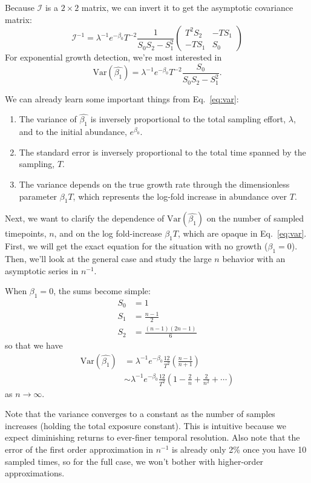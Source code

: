 \documentclass[12pt, letterpaper]{article}
\begin{document}
Because $\mathcal{I}$ is a $2 \times 2$ matrix, we can invert it to get the asymptotic covariance matrix:
\begin{equation}
    {\mathcal{I}}^{-1} = \lambda^{-1} e^{-\beta_0} T^{-2} \frac{1}{S_0 S_2 - S_1^2}
    \begin{pmatrix}
        T^2 S_2 & -T S_1 \\
        -T S_1 & S_0
    \end{pmatrix}
\end{equation}
For exponential growth detection, we're most interested in
\begin{equation}
    \textrm{Var}(\hat{\beta_1}) = \lambda^{-1} e^{-\beta_0} T^{-2} \frac{S_0}{S_0 S_2 - S_1^2}.
    \label{eq:var}
\end{equation}

We can already learn some important things from Eq.~\ref{eq:var}:
\begin{enumerate}
    \item The variance of $\hat{\beta_1}$ is inversely proportional to the total sampling effort, $\lambda$, and to the initial abundance, $e^{\beta_0}$.
    \item The standard error is inversely proportional to the total time spanned by the sampling, $T$.
    \item The variance depends on the true growth rate through the dimensionless parameter $\beta_1 T$, which represents the log-fold increase in abundance over $T$.
\end{enumerate}

Next, we want to clarify the dependence of $\textrm{Var}(\hat{\beta_1})$ on the number of sampled timepoints, $n$, and on the log fold-increase $\beta_1 T$, which are opaque in Eq.~\ref{eq:var}.
First, we will get the exact equation for the situation with no growth ($\beta_1 = 0$).
Then, we'll look at the general case and study the large $n$ behavior with an asymptotic series in $n^{-1}$.

When $\beta_1 = 0$, the sums become simple:
\begin{align}
    S_0 &= 1 \\
    S_1 &= \frac{n-1}{2} \\
    S_2 &= \frac{(n-1)(2n-1)}{6}
\end{align}
so that we have
\begin{align}
    \textrm{Var}(\hat{\beta_1}) &= \lambda^{-1} e^{-\beta_0} \frac{12}{T^2} \left(\frac{n-1}{n+1}\right) \\
                                &\sim \lambda^{-1} e^{-\beta_0} \frac{12}{T^2} \left(1 - \frac{2}{n} + \frac{2}{n^2} + \cdots\right)
\end{align}
as $n \to \infty$.

Note that the variance converges to a constant as the number of samples increases (holding the total exposure constant).
This is intuitive because we expect diminishing returns to ever-finer temporal resolution.
Also note that the error of the first order approximation in $n^{-1}$ is already only 2\% once you have 10 sampled times, so for the full case, we won't bother with higher-order approximations.
\end{document}
